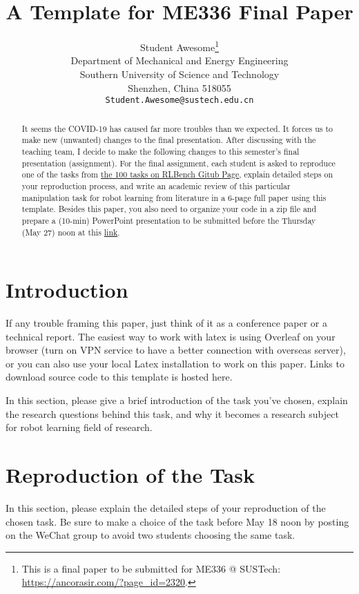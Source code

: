 \documentclass{article}
\title{A Template for ME336 Final Paper}
\author{
  Student Awesome\thanks{This is a final paper to be submitted for ME336 @ SUSTech: \url{https://ancorasir.com/?page_id=2320}. } \\
  Department of Mechanical and Energy Engineering\\
  Southern University of Science and Technology\\
  Shenzhen, China 518055 \\
  \texttt{Student.Awesome@sustech.edu.cn} \\
}
\begin{document}
\maketitle

\begin{abstract}
It seems the COVID-19 has caused far more troubles than we expected. It forces us to make new (unwanted) changes to the final presentation. After discussing with the teaching team, I decide to make the following changes to this semester's final presentation (assignment). For the final assignment, each student is asked to reproduce one of the tasks from \href{https://github.com/stepjam/RLBench}{the 100 tasks on RLBench Gitub Page}, explain detailed steps on your reproduction process, and write an academic review of this particular manipulation task for robot learning from literature in a 6-page full paper using this template. Besides this paper, you also need to organize your code in a zip file and prepare a (10-min) PowerPoint presentation to be submitted before the Thursday (May 27) noon at this \href{https://jinshuju.net/f/wsq98y}{link}.
\end{abstract}



\section{Introduction}
\label{sec:intro}
If any trouble framing this paper, just think of it as a conference paper or a technical report. The easiest way to work with latex is using Overleaf on your browser (turn on VPN service to have a better connection with overseas server), or you can also use your local Latex installation to work on this paper. Links to download source code to this template is hosted here.

In this section, please give a brief introduction of the task you've chosen, explain the research questions behind this task, and why it becomes a research subject for robot learning field of research.

\section{Reproduction of the Task}
\label{sec:taskReproduction}
In this section, please explain the detailed steps of your reproduction of the chosen task. Be sure to make a choice of the task before May 18 noon by posting on the WeChat group to avoid two students choosing the same task. 
\end{document}
